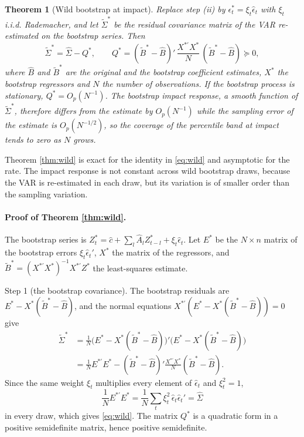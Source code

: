 \documentclass[12pt,a4paper]{article}
\newtheorem{thm}{Theorem}
\theoremstyle{definition}
\begin{document}
\begin{thm}[Wild bootstrap at impact\label{thm:wild}]
Replace step (ii) by $\epsilon^\ast_t=\xi_t\hat\epsilon_t$ with $\xi_t$ i.i.d. Rademacher, and let $\tilde\Sigma^\ast$ be the residual covariance matrix of the VAR re-estimated on the bootstrap series. Then
\begin{equation}
\tilde\Sigma^\ast=\hat\Sigma-Q^\ast,\qquad Q^\ast=(\tilde B^\ast-\hat B)'\,\frac{X^{\ast\prime}X^\ast}{N}\,(\tilde B^\ast-\hat B)\succeq0,
\label{eq:wild}
\end{equation}
where $\hat B$ and $\tilde B^\ast$ are the original and the bootstrap coefficient estimates, $X^\ast$ the bootstrap regressors and $N$ the number of observations. If the bootstrap process is stationary, $Q^\ast=O_p(N^{-1})$. The bootstrap impact response, a smooth function of $\tilde\Sigma^\ast$, therefore differs from the estimate by $O_p(N^{-1})$ while the sampling error of the estimate is $O_p(N^{-1/2})$, so the coverage of the percentile band at impact tends to zero as $N$ grows.
\end{thm}



Theorem \ref{thm:wild} is exact for the identity in \eqref{eq:wild} and asymptotic for the rate. The impact response is not constant across wild bootstrap draws, because the VAR is re-estimated in each draw, but its variation is of smaller order than the sampling variation.

\paragraph{Proof of Theorem \ref{thm:wild}.} The bootstrap series is $Z^\ast_t=\hat c+\sum_l\hat A_lZ^\ast_{t-l}+\xi_t\hat\epsilon_t$. Let $E^\ast$ be the $N\times n$ matrix of the bootstrap errors $\xi_t\hat\epsilon_t'$, $X^\ast$ the matrix of the regressors, and $\tilde B^\ast=(X^{\ast\prime}X^\ast)^{-1}X^{\ast\prime}Z^\ast$ the least-squares estimate.

Step 1 (the bootstrap covariance). The bootstrap residuals are $E^\ast-X^\ast(\tilde B^\ast-\hat B)$, and the normal equations $X^{\ast\prime}(E^\ast-X^\ast(\tilde B^\ast-\hat B))=0$ give
\[
\begin{aligned}
\tilde\Sigma^\ast&=\frac1N\big(E^\ast-X^\ast(\tilde B^\ast-\hat B)\big)'\big(E^\ast-X^\ast(\tilde B^\ast-\hat B)\big)\\
&=\frac1NE^{\ast\prime}E^\ast-(\tilde B^\ast-\hat B)'\frac{X^{\ast\prime}X^\ast}{N}(\tilde B^\ast-\hat B).
\end{aligned}
\]
Since the same weight $\xi_t$ multiplies every element of $\hat\epsilon_t$ and $\xi_t^2=1$,
\[
\frac1NE^{\ast\prime}E^\ast=\frac1N\sum_t\xi_t^2\,\hat\epsilon_t\hat\epsilon_t'=\hat\Sigma
\]
in every draw, which gives \eqref{eq:wild}. The matrix $Q^\ast$ is a quadratic form in a positive semidefinite matrix, hence positive semidefinite.
\end{document}
